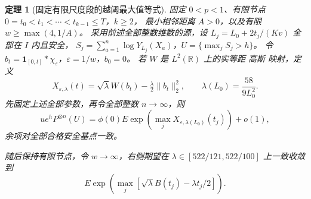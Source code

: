 \documentclass[UTF8,a4paper,11pt,fontset=fandol]{ctexart}
\newtheorem{theorem}{定理}
\theoremstyle{remark}
\begin{document}
\begin{theorem}[固定有限尺度段的越阈最大值等式]\label{thm:paperwinner}
固定 $0<p<1$、有限节点 $0=t_0<t_1<\cdots<t_{k-1}\le T$，$k\ge2$，
最小相邻距离 $A>0$，以及有限 $w\ge\max(4,1/A)$。
采用前述全部整数维数的源，设 $L_j=L_0+2t_j/(Kv)$ 全部在 $I$ 内且安全，
$S_j=\sum_{a=1}^n\log Y_{L_j}(X_a)$，$U=\{\max_jS_j>h\}$。
令 $b_t=\mathbf1_{[0,t]}*\chi_\varepsilon$，$\varepsilon=1/w$，$b_0=0$。
若 $W$ 是 $L^2(\mathbb R)$ 上的实等距 高斯 映射，定义
\[
 X_{\varepsilon,\lambda}(t)=\sqrt\lambda W(b_t)-\tfrac\lambda2\|b_t\|_2^2,
 \qquad\lambda(L_0)=\frac{58}{9L_0^2}.
\]
先固定上述全部参数，再令全部整数 $n\to\infty$，则
\begin{equation}\label{eq:paperwinner}
 ue^hP^{\otimes n}(U)=\phi(0)E\exp(\max_jX_{\varepsilon,\lambda(L_0)}(t_j))+o(1),
\end{equation}
余项对全部合格安全基点一致。
\par 随后保持有限节点，令 $w\to\infty$，右侧期望在
$\lambda\in[522/121,522/100]$ 上一致收敛到
\[ E\exp(\max_j[\sqrt\lambda B(t_j)-\lambda t_j/2]).\]
\end{theorem}
\end{document}
